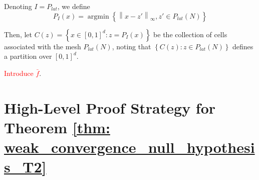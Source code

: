 \documentclass{article}
\newcommand{\norm}[1]{\left\lVert#1\right\rVert}
\newcommand{\set}[1]{\left\{#1\right\}}
\DeclareMathOperator*{\argmin}{argmin}
\newcommand{\1}{\mathbf{1}}
\theoremstyle{alden}
\theoremstyle{aldenthm}
\theoremstyle{remark}
\begin{document}
Denoting $I = P_{lat}$, we define
\begin{equation*}
P_I(x) = \argmin \set{\norm{x - z'}_{\infty}, z' \in P_{lat}(N)}
\end{equation*}

Then, let $C(z) = \set{x \in [0,1]^d: z =  P_I(x)}$ be the collection of cells associated with the mesh $P_{lat}(N)$, noting that $\set{C(z): z \in P_{lat}(N)}$ defines a partition over $[0,1]^d$.

\textcolor{red}{Introduce $\bar{f}$}.

\section{High-Level Proof Strategy for Theorem \ref{thm: weak_convergence_null_hypothesis_T2}}
\end{document}
